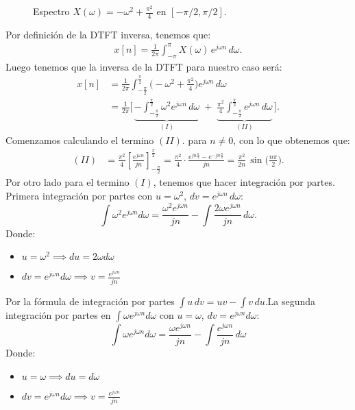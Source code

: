 \documentclass[
  11pt,
  letterpaper,
   addpoints,
   answers
  ]{exam}
\begin{document}
\begin{questions}
\begin{solution}
\begin{figure}[H]
\begin{tikzpicture}[scale=1.2]
\end{tikzpicture}
\caption{Espectro $X(\omega)=-\omega^2+\tfrac{\pi^2}{4}$ en $[-\pi/2,\pi/2]$.}
\end{figure}
Por definición de la DTFT inversa, tenemos que:
\begin{align}
  x[n]= \frac{1}{2\pi}\int_{-\pi}^{\pi}X(\omega)\,e^{j\omega n}\,d\omega.
\end{align}
Luego tenemos que la inversa de la DTFT para nuestro caso será:
\begin{align}
x[n]&=\frac{1}{2\pi}\int_{-\frac{\pi}{2}}^{\frac{\pi}{2}}\Big(-\omega^2+\frac{\pi^2}{4}\Big)e^{j\omega n}\,d\omega\\
&=\frac{1}{2\pi}\Big[\,\underbrace{-\!\int_{-\frac{\pi}{2}}^{\frac{\pi}{2}}\omega^2 e^{j\omega n}\,d\omega}_{(I)}\;
+\;\underbrace{\frac{\pi^2}{4}\!\int_{-\frac{\pi}{2}}^{\frac{\pi}{2}} e^{j\omega n}\,d\omega}_{(II)}\,\Big].
\end{align}
Comenzamos calculando el termino $(II)$. para $n\neq 0$, con lo que obtenemos que:
\begin{align*}
(II)&=\frac{\pi^2}{4}\left[\frac{e^{j\omega n}}{j n}\right]_{-\frac{\pi}{2}}^{\frac{\pi}{2}}
=\frac{\pi^2}{4}\cdot\frac{e^{j n\frac{\pi}{2}}-e^{-j n\frac{\pi}{2}}}{j n}
=\frac{\pi^2}{2n}\,\sin\!\Big(\frac{n\pi}{2}\Big).
\end{align*}
Por otro lado para el termino $(I)$, tenemos que hacer integración por partes. Primera integración por partes con $u=\omega^2$, $dv=e^{j\omega n}\,d\omega$:
\[
\int \omega^2 e^{j\omega n}d\omega=\frac{\omega^2 e^{j\omega n}}{j n}-\int \frac{2\omega e^{j\omega n}}{j n}\,d\omega.
\]
Donde:
\begin{itemize}
  \item $u=\omega^2 \implies du=2\omega d\omega$
  \item $dv=e^{j\omega n}d\omega \implies v=\frac{e^{j\omega n}}{j n}$
\end{itemize}
Por la fórmula de integración por partes $\int u\,dv = uv - \int v\,du$.La segunda integración por partes en $\displaystyle \int \omega e^{j\omega n}d\omega$ con $u=\omega$, $dv=e^{j\omega n}d\omega$:
\[
\int \omega e^{j\omega n}d\omega=\frac{\omega e^{j\omega n}}{j n}-\int \frac{e^{j\omega n}}{j n}\,d\omega
\]
Donde:
\begin{itemize}
  \item $u=\omega \implies du=d\omega$
  \item $dv=e^{j\omega n}d\omega \implies v=\frac{e^{j\omega n}}{j n}$
\end{itemize}

\end{solution}
\end{questions}
\end{document}

